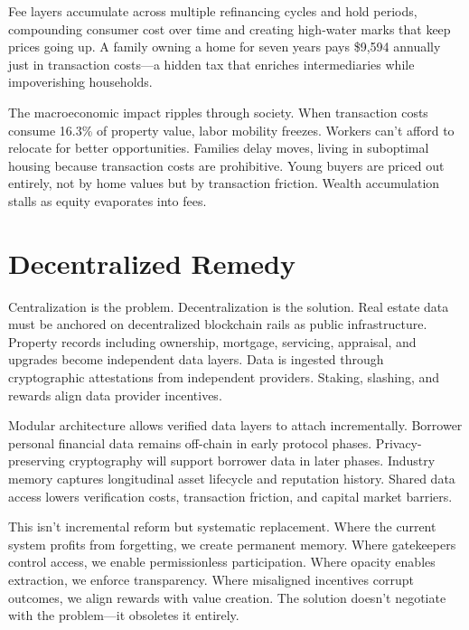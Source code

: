 Fee layers accumulate across multiple refinancing cycles and hold periods, compounding consumer cost over time and creating high-water marks that keep prices going up. A family owning a home for seven years pays \$9,594 annually just in transaction costs---a hidden tax that enriches intermediaries while impoverishing households.

The macroeconomic impact ripples through society. When transaction costs consume 16.3\% of property value, labor mobility freezes. Workers can't afford to relocate for better opportunities. Families delay moves, living in suboptimal housing because transaction costs are prohibitive. Young buyers are priced out entirely, not by home values but by transaction friction. Wealth accumulation stalls as equity evaporates into fees.

\section{Decentralized Remedy}

Centralization is the problem. Decentralization is the solution. Real estate data must be anchored on decentralized blockchain rails as public infrastructure. Property records including ownership, mortgage, servicing, appraisal, and upgrades become independent data layers. Data is ingested through cryptographic attestations from independent providers. Staking, slashing, and rewards align data provider incentives.

Modular architecture allows verified data layers to attach incrementally. Borrower personal financial data remains off-chain in early protocol phases. Privacy-preserving cryptography will support borrower data in later phases. Industry memory captures longitudinal asset lifecycle and reputation history. Shared data access lowers verification costs, transaction friction, and capital market barriers.

This isn't incremental reform but systematic replacement. Where the current system profits from forgetting, we create permanent memory. Where gatekeepers control access, we enable permissionless participation. Where opacity enables extraction, we enforce transparency. Where misaligned incentives corrupt outcomes, we align rewards with value creation. The solution doesn't negotiate with the problem---it obsoletes it entirely.